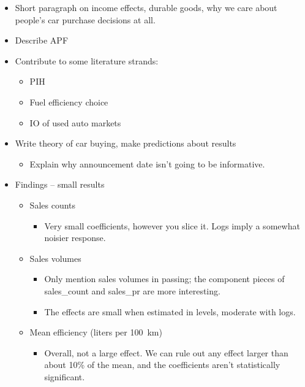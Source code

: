 \documentclass[11pt,letterpaper,oneside]{article}
\begin{document}
\begin{itemize}
    \item Short paragraph on income effects, durable goods, why we care about people's car purchase decisions at all.
    \item Describe APF
    \item Contribute to some literature strands:
    \begin{itemize}
        \item PIH
        \item Fuel efficiency choice
        \item IO of used auto markets
    \end{itemize}
    \item Write theory of car buying, make predictions about results
    \begin{itemize}
        \item Explain why announcement date isn't going to be informative.
    \end{itemize}

    \item Findings -- small results
    \begin{itemize}
        \item Sales counts
        \begin{itemize}
            \item Very small coefficients, however you slice it.  Logs imply a somewhat noisier response.
        \end{itemize}

        \item Sales volumes
        \begin{itemize}
            \item  Only mention sales volumes in passing; the component pieces of sales\_count and sales\_pr are more interesting.
            \item The effects are small when estimated in levels, moderate with logs.
        \end{itemize}
        \item Mean efficiency (liters per 100~km)
        \begin{itemize}
            \item Overall, not a large effect. We can rule out any effect larger than about 10\% of the mean, and the coefficients aren't statistically significant.


\end{itemize}
\end{itemize}
\end{itemize}
\end{document}
